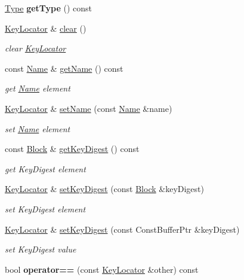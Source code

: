 \begin{DoxyCompactItemize}
\item 
\hyperlink{classndn_1_1KeyLocator_acede373a69c62b274b2356134ff1d689}{Type} {\bfseries get\+Type} () const\hypertarget{classndn_1_1KeyLocator_a498c8fb7a1f06d4c02a5f5d908e3b27e}{}\label{classndn_1_1KeyLocator_a498c8fb7a1f06d4c02a5f5d908e3b27e}

\item 
\hyperlink{classndn_1_1KeyLocator}{Key\+Locator} \& \hyperlink{classndn_1_1KeyLocator_ac2139fe79a7f789724762a56e3fcd356}{clear} ()
\begin{DoxyCompactList}\small\item\em clear \hyperlink{classndn_1_1KeyLocator}{Key\+Locator} \end{DoxyCompactList}\item 
const \hyperlink{classndn_1_1Name}{Name} \& \hyperlink{classndn_1_1KeyLocator_a4be534ac984e227d578e01625e723add}{get\+Name} () const
\begin{DoxyCompactList}\small\item\em get \hyperlink{classndn_1_1Name}{Name} element \end{DoxyCompactList}\item 
\hyperlink{classndn_1_1KeyLocator}{Key\+Locator} \& \hyperlink{classndn_1_1KeyLocator_ac89c7b3c1b0c79b4a4cbe2883a0d4982}{set\+Name} (const \hyperlink{classndn_1_1Name}{Name} \&name)
\begin{DoxyCompactList}\small\item\em set \hyperlink{classndn_1_1Name}{Name} element \end{DoxyCompactList}\item 
const \hyperlink{classndn_1_1Block}{Block} \& \hyperlink{classndn_1_1KeyLocator_a1845b503c6f1d16f295cca4b9bc72a60}{get\+Key\+Digest} () const
\begin{DoxyCompactList}\small\item\em get Key\+Digest element \end{DoxyCompactList}\item 
\hyperlink{classndn_1_1KeyLocator}{Key\+Locator} \& \hyperlink{classndn_1_1KeyLocator_ab49ef0512a400e8c7f71e8ff2dcbcc75}{set\+Key\+Digest} (const \hyperlink{classndn_1_1Block}{Block} \&key\+Digest)
\begin{DoxyCompactList}\small\item\em set Key\+Digest element \end{DoxyCompactList}\item 
\hyperlink{classndn_1_1KeyLocator}{Key\+Locator} \& \hyperlink{classndn_1_1KeyLocator_a07e3da80a54635615e76508bf7bf60d2}{set\+Key\+Digest} (const Const\+Buffer\+Ptr \&key\+Digest)
\begin{DoxyCompactList}\small\item\em set Key\+Digest value \end{DoxyCompactList}\item 
bool {\bfseries operator==} (const \hyperlink{classndn_1_1KeyLocator}{Key\+Locator} \&other) const\hypertarget{classndn_1_1KeyLocator_a9ca6d643e13ad35a46212c02e5833cad}{}\label{classndn_1_1KeyLocator_a9ca6d643e13ad35a46212c02e5833cad}


\end{DoxyCompactItemize}
